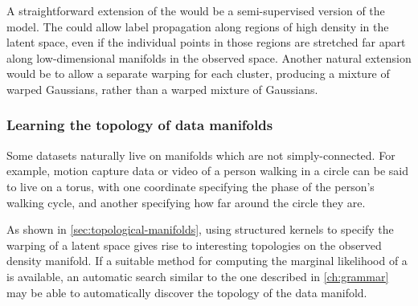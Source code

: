 A straightforward extension of the \iwmm{} would be a semi-supervised version of the model.
The \iwmm{} could allow label propagation along regions of high density in the latent space, even if the individual points in those regions are stretched far apart along low-dimensional manifolds in the observed space.
Another natural extension would be to allow a separate warping for each cluster, producing a mixture of warped Gaussians, rather than a warped mixture of Gaussians.%




\subsubsection{Learning the topology of data manifolds}

Some datasets naturally live on manifolds which are not simply-connected.
For example, motion capture data or video of a person walking in a circle can be said to live on a torus, with one coordinate specifying the phase of the person's walking cycle, and another specifying how far around the circle they are.

As shown in \cref{sec:topological-manifolds}, using structured kernels to specify the warping of a latent space gives rise to interesting topologies on the observed density manifold.
If a suitable method for computing the marginal likelihood of a \gplvm{} is available, an automatic search similar to the one described in \cref{ch:grammar} may be able to automatically discover the topology of the data manifold.





%
%


